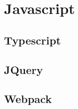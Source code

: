 \newpage
\section{Javascript}
    \subsection{Typescript}
    \subsection{JQuery}
    \subsection{Webpack}
